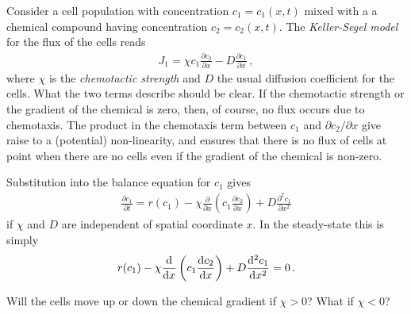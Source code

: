 Consider a cell population with concentration $c_1=c_1(x,t)$ mixed with a
a chemical compound having concentration $c_2=c_2(x,t)$. The \emph{Keller-Segel
model}  for the flux of the cells reads
\begin{eqnarray}
	J_1 = \chi c_1 \frac{\partial c_2}{\partial x} - D \frac{\partial c_1}{\partial x} \, ,
\end{eqnarray}
where $\chi$ is the \emph{chemotactic strength}  and $D$ the usual diffusion 
coefficient for the cells. What the two terms describe should be clear. If the chemotactic strength 
or the gradient of the chemical is zero, then, of course, no flux occurs due to chemotaxis. 
The product in the chemotaxis term between $c_1$ and $\partial c_2/\partial x$ give raise to a 
(potential) non-linearity, and ensures that there is no flux of cells at point when there are no
cells even if the gradient of the chemical is non-zero. 

Substitution into the balance equation for $c_1$ gives 	
\begin{eqnarray}
	\frac{\partial c_1}{\partial t} = r(c_1) - \chi \frac{\partial}{\partial x} \left( c_1 \frac{\partial c_2}{\partial x} \right)
	+ D \frac{\partial^2c_1}{\partial x^2} 
\end{eqnarray}
if $\chi$ and $D$ are independent of spatial coordinate $x$. In the steady-state this is simply
\begin{eqnarray}
	r(c_1) -\chi \frac{\mathrm{d}}{\mathrm{d} x} \left( c_1 \frac{\mathrm{d} c_2}{\mathrm{d} x}\right) + D\frac{\mathrm{d} ^2 c_1}{\mathrm{d} x^2} = 0 \, . 
\end{eqnarray}

\begin{question}
	Will the cells move up or down the chemical gradient if $\chi > 0$? What if $\chi <	0$?
\end{question}

